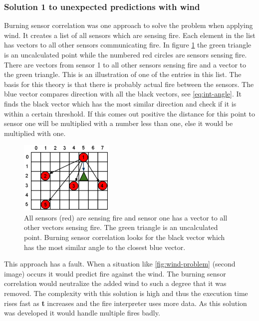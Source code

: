 \subsubsection{Solution 1 to unexpected predictions with wind}
Burning sensor correlation was one approach to solve the problem when applying wind. It creates a list of all sensors which are sensing fire. Each element in the list has vectors to all other sensors communicating fire. In figure \ref{fig:burning-sensor-correlation} the green triangle is an uncalculated point while the numbered red circles are sensors sensing fire. There are vectors from sensor 1 to all other sensors sensing fire and a vector to the green triangle. This is an illustration of one of the entries in this list. The basis for this theory is that there is probably actual fire between the sensors. The blue vector compares direction with all the black vectors, see \ref{eq:int-angle}. It finds the black vector which has the most similar direction and check if it is within a certain threshold. If this comes out positive the distance for this point to sensor one will be multiplied with a number less than one, else it would be multiplied with one.
\begin{figure}[here]
  \centering
      \includegraphics[width=0.4\textwidth]{solution/graphics/burning-sensor-correlation.png}
  \caption{All sensors (red) are sensing fire and sensor one has a vector to all other vectors sensing fire. The green triangle is an uncalculated point. Burning sensor correlation looks for the black vector which has the most similar angle to the closest blue vector.}
  \label{fig:burning-sensor-correlation}
\end{figure}
This approach has a fault. When a situation like \ref{fig:wind-problem} (second image) occurs it would predict fire against the wind. The burning sensor correlation would neutralize the added wind to such a degree that it was removed. The complexity with this solution is high and thus the execution time rises fast as \textbf{t} increases and the fire interpreter uses more data. As this solution was developed it would handle multiple fires badly.
